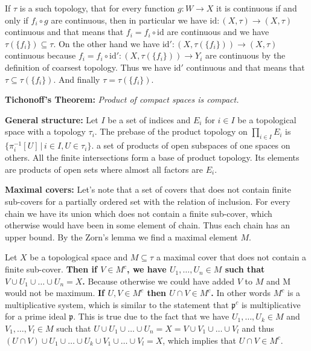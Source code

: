 \documentclass{article}
\begin{document}
If $\tau$ is a such topology, that for every function $g:W\rightarrow X$ it is
continuous if and only if $f_i\circ g$ are continuous, then in particular we
have $\text{id}:(X,\tau)\rightarrow(X,\tau)$ continuous and that means that $f_i = f_i\circ
\text{id}$ are continuous and we have $\tau(\{f_i\})\subseteq\tau$. On the other
hand we have $\text{id}':(X,\tau(\{f_i\}))\rightarrow(X,\tau)$ continuous
because $f_i = f_i\circ\text{id}':(X,\tau(\{f_i\}))\rightarrow Y_i$ are continuous
by the definition of coarsest topology. Thus we have $\text{id}'$ continuous
and that means that $\tau\subseteq\tau(\{f_i\})$. And finally $\tau=\tau(\{f_i\})$.

\vspace{1ex}

\textbf{Tichonoff's Theorem:} \textit{Product of compact spaces is compact.}
\vspace{1ex}

\textbf{General structure:} Let $I$ be a set of indices and $E_i$ for $i\in I$
be a topological space with a topology $\tau_i$. The prebase of the product
topology on  $\prod_{i\in I} E_i$ is $\{\pi_i^{-1}[U]\,|\,i\in I,U\in\tau_i\}$.
a set of products of open subspaces of one spaces on others. All the finite
intersections form a base of product topology. Its elements are products of
open sets where almost all factors are $E_i$.
\vspace{1ex}

\textbf{Maximal covers:} Let's note that a set of covers that does not contain
finite sub-covers for a partially ordered set with the relation of inclusion.
For every chain we have its union which does not contain a finite sub-cover,
which otherwise would have been in some element of chain. Thus each chain has an
upper bound. By the Zorn's lemma we find a maximal element $M$.
\vspace{1ex}

Let $X$ be a topological space and $M\subseteq\tau$ a maximal cover that does
not contain a finite sub-cover. \textbf{Then if $V\in M^c$, we have $U_1,\ldots,
U_n\in M$ such that $V\cup U_1\cup\ldots\cup U_n=X$.} Because otherwise we
could have added $V$ to $M$ and M would not be maximum. \textbf{If
$U,V\in M^c$ then $U\cap V\in M^c$.} In other words $M^c$ is a multiplicative
system, which is similar to the statement that $\mathfrak{p}^c$ is multiplicative
for a prime ideal $\mathfrak{p}$. This is true due to the fact that we have
$U_1,\ldots,U_k\in M$ and $V_1,\ldots,V_l\in M$ such that $U\cup U_1\cup\ldots
\cup U_n = X = V\cup V_1\cup\ldots\cup V_l$ and thus $(U\cap V)\cup U_1\cup\ldots
\cup U_k\cup V_1\cup\ldots\cup V_l=X$, which implies that $U\cap V\in M^c$.
\vspace{1ex}
\end{document}
